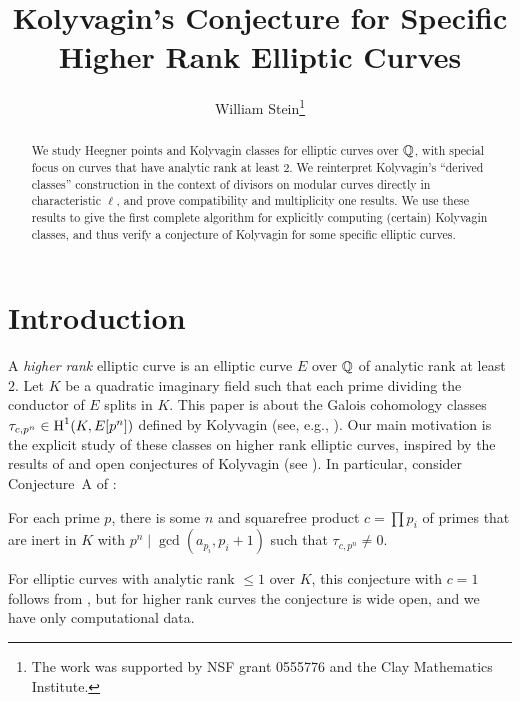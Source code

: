 \documentclass{article} \usepackage[active]{srcltx}
\title{Kolyvagin's Conjecture for Specific Higher Rank Elliptic Curves}
\author{William Stein\footnote{The work was supported by NSF grant
0555776 and the Clay Mathematics Institute.}}
\begin{document}
\maketitle

\begin{abstract} We study Heegner points and Kolyvagin classes for
  elliptic curves over $\mathbb{Q}$, with special focus on curves that have
  analytic rank at least $2$.  We reinterpret Kolyvagin's ``derived
  classes'' construction in the context of divisors on modular curves
  directly in characteristic $\ell$, and prove compatibility and
  multiplicity one results.  We use these results to give the first
  complete algorithm for explicitly computing (certain) Kolyvagin
  classes, and thus verify a conjecture of Kolyvagin
  for some specific elliptic curves.
\end{abstract}


\section{Introduction}\label{sec:intro}

A {\em higher rank} elliptic curve is an elliptic curve $E$ over $\mathbb{Q}$
of analytic rank at least $2$.  Let $K$ be a quadratic imaginary field
such that each prime dividing the conductor of $E$ splits in $K$.
This paper is about the Galois cohomology classes $\tau_{c,p^n} \in
\operatorname{H}^1(K,E[p^n])$ defined by Kolyvagin (see, e.g.,
\cite{kolyvagin:subclass, gross:kolyvagin, mccallum:kolyvagin}).  Our
main motivation is the explicit study of these classes on higher rank
elliptic curves, inspired by the results of
\cite{stein:ggz,bradshaw-stein:heegner} and open conjectures of
Kolyvagin (see \cite{kolyvagin:structure_of_selmer, ciperiani-wiles}).  In
particular, consider Conjecture~A of
\cite[pg.~255]{kolyvagin:structure_of_selmer}:
\begin{conjecture}[Kolyvagin]\label{conj:koly}
  For each prime $p$, there is some $n$ and squarefree product 
$c=\prod p_i$ of primes that are inert in $K$ with $p^n \mid \gcd(a_{p_i},
  p_i+1)$ such that $\tau_{c,p^n}\neq 0$.
\end{conjecture}
For elliptic curves with analytic rank $\leq 1$ over $K$, this
conjecture with $c=1$ follows from \cite{gross-zagier}, but for higher
rank curves the conjecture is wide open, and we have only
computational data.  

\end{document}
